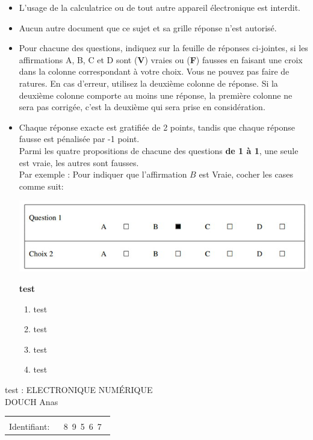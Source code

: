 \documentclass{book}%
\begin{document}
\begin{itemize}%
\item%
L'usage de la calculatrice ou de tout autre appareil électronique est interdit.%
\item%
Aucun autre document que ce sujet et sa grille réponse n'est autorisé.%
\item%
Pour chacune des questions, indiquez sur la feuille de réponses ci-jointes, si les affirmations A, B, C et D sont (\textbf{V}) vraies ou (\textbf{F}) fausses en faisant une croix dans la colonne correspondant à votre choix. Vous ne pouvez pas faire de ratures. En cas d'erreur, utilisez la deuxième colonne de réponse. Si la deuxième colonne comporte au moins une réponse, la première colonne ne sera pas corrigée, c'est la deuxième qui sera prise en considération.%
\item%
Chaque réponse exacte est gratifiée de 2 points, tandis que chaque réponse fausse est pénalisée par -1 point. \\ 	Parmi les quatre propositions de chacune des questions \textbf{de 1 à 1}, une seule est vraie, les autres sont fausses. \\ 	Par exemple : Pour indiquer que l'affirmation $B$ est Vraie, cocher les cases comme suit:  \\ \begin{center}	\includegraphics[scale=0.8]{reponses.png} \end{center}%
\thispagestyle{empty}%
\begin{exercise}%
\textbf{test }%
\begin{enumerate}[label=\textbf{\Alph*. }]%
\item%
test%
\item%
test%
\item%
test%
\item%
test%
\end{enumerate}%
\end{exercise}%
\end{itemize}%
\newpage%
\thispagestyle{empty}%
test : ELECTRONIQUE NUMÉRIQUE $\qquad \qquad \qquad \qquad \qquad \qquad \qquad \qquad$ DOUCH Anas%
\begin{flushright}%
\begin{tabular}{|l|}%
\hline%
 \\%
\thispagestyle{empty}%
Identifiant: $\quad$ {\Large 8~9~5~6~7~}%
 \\%
\hline%
\end{tabular}%
\end{flushright}%
\end{document}
